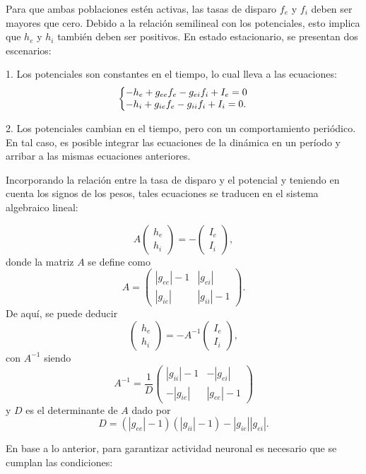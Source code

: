 \documentclass[aps,prb,twocolumn,superscriptaddress,floatfix,longbibliography]{revtex4-2}
\newcounter{para}
\begin{document}
Para que ambas poblaciones estén activas, las tasas de disparo \(f_e\) y \(f_i\) deben ser mayores que cero. Debido a la relación semilineal con los potenciales, esto implica que \(h_e\) y \(h_i\) también deben ser positivos. En estado estacionario, se presentan dos escenarios:

1. Los potenciales son constantes en el tiempo, lo cual lleva a las ecuaciones:
\[
\left\{\begin{array}{@{}l@{}}
    -h_e + g_{ee} f_e - g_{ei} f_i + I_e = 0 \\
    -h_i + g_{ie} f_e - g_{ii} f_i + I_i = 0.
    \end{array}\right.
\]
    
2. Los potenciales cambian en el tiempo, pero con un comportamiento periódico. En tal caso, es posible integrar las ecuaciones de la dinámica en un período y arribar a las mismas ecuaciones anteriores.

Incorporando la relación entre la tasa de disparo y el potencial y teniendo en cuenta los signos de los pesos, tales ecuaciones se traducen en el sistema algebraico lineal:

\[ A \begin{pmatrix} h_e \\ h_i \end{pmatrix} = - \begin{pmatrix} I_e \\ I_i \end{pmatrix}, \]
donde la matriz \(A\) se define como
\[ A = \begin{pmatrix} |g_{ee}| - 1 & |g_{ei}| \\ |g_{ie}| & |g_{ii}| - 1 \end{pmatrix}. \]
De aquí, se puede deducir
\[ \begin{pmatrix} h_e \\ h_i \end{pmatrix} = - A^{-1} \begin{pmatrix} I_e \\ I_i \end{pmatrix}, \]
con \(A^{-1}\) siendo
\[ A^{-1} = \frac{1}{D} \begin{pmatrix} |g_{ii}| - 1 & -|g_{ei}| \\ -|g_{ie}| & |g_{ee}| - 1 \end{pmatrix} \]
y \(D\) es el determinante de \(A\) dado por
\[D = (|g_{ee}| - 1)(|g_{ii}| - 1) - |g_{ie}||g_{ei}|.\]

En base a lo anterior, para garantizar actividad neuronal es necesario que se cumplan las condiciones:
\end{document}
